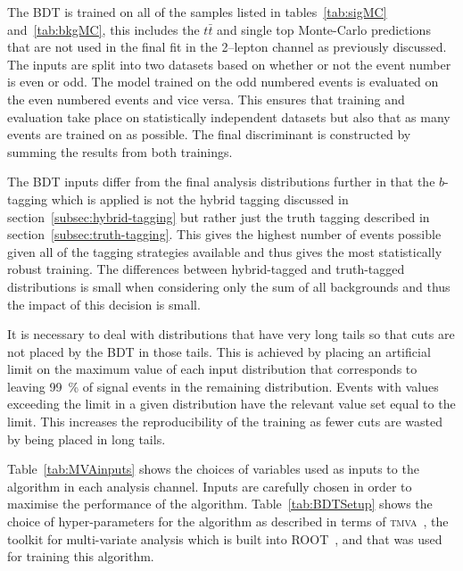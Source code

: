 The BDT is trained on all of the samples listed in tables~\ref{tab:sigMC}
and~\ref{tab:bkgMC}, this includes the $t\bar{t}$ and single top Monte-Carlo
predictions that are not used in the final fit in the 2--lepton channel as
previously discussed. The inputs are split into two datasets based on whether or
not the event number is even or odd. The model trained on the odd numbered
events is evaluated on the even numbered events and vice versa. This ensures
that training and evaluation take place on statistically independent datasets
but also that as many events are trained on as possible. The final discriminant
is constructed by summing the results from both trainings.

The BDT inputs differ from the final analysis distributions further in that the
$b$-tagging which is applied is not the hybrid tagging discussed in
section~\ref{subsec:hybrid-tagging} but rather just the truth tagging described
in section~\ref{subsec:truth-tagging}. This gives the highest number of events
possible given all of the tagging strategies available and thus gives the most
statistically robust training. The differences between hybrid-tagged and
truth-tagged distributions is small when considering only the sum of all
backgrounds and thus the impact of this decision is small.

It is necessary to deal with distributions that have very long tails so that
cuts are not placed by the BDT in those tails. This is achieved by placing an
artificial limit on the maximum value of each input distribution that
corresponds to leaving 99~\% of signal events in the remaining distribution.
Events with values exceeding the limit in a given distribution have the relevant
value set equal to the limit. This increases the reproducibility of the training
as fewer cuts are wasted by being placed in long tails.

Table~\ref{tab:MVAinputs} shows the choices of variables used as inputs to the
algorithm in each analysis channel. Inputs are carefully chosen in order to
maximise the performance of the algorithm.
 Table~\ref{tab:BDTSetup} shows the
choice of hyper-parameters for the algorithm as described in terms of
\textsc{tmva}~\cite{TMVA}, the toolkit for multi-variate analysis which is built
into \textsc{ROOT}~\cite{ROOT}, and that was used for training this algorithm.


